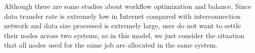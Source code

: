 Although there are some studies about workflow optimization and  balance\cite{Workload}, Since data transfer rate is extremely low in Internet compared with interconnection network and data size processed is extremely large, user do not want to settle their nodes across two systems, so in this model, we just consider the situation that all nodes used for the same job are allocated in the same system.
